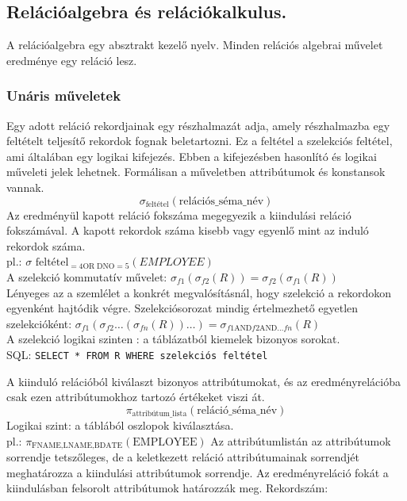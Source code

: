 \subsection{Relációalgebra és relációkalkulus. }
A relációalgebra egy absztrakt kezelő nyelv. Minden relációs algebrai művelet eredménye egy reláció lesz.

\subsubsection{Unáris műveletek}
\begin{description}[nosep]
	\item[Szelekció ($\sigma$)] Egy adott reláció rekordjainak egy részhalmazát adja, amely részhalmazba egy feltételt teljesítő rekordok fognak beletartozni. Ez a feltétel a szelekciós feltétel, ami általában egy logikai kifejezés. Ebben a kifejezésben hasonlító és logikai műveleti jelek lehetnek. Formálisan a műveletben attribútumok és konstansok vannak.\\
	$$\sigma_\text{feltétel}(\text{relációs\_séma\_név})$$
	Az eredményül kapott reláció fokszáma megegyezik a kiindulási reláció fokszámával. A kapott rekordok száma kisebb vagy egyenlő mint az induló rekordok száma.\\
	pl.: $\sigma\text{ feltétel}_{=4 \text{OR}\;\text{DNO}=5}(EMPLOYEE)$\\
	A szelekció kommutatív művelet: $\sigma_{f1}(\sigma_{f2}(R))=\sigma_{f2}(\sigma_{f1}(R))$\\
	Lényeges az a szemlélet a konkrét megvalósításnál, hogy szelekció a rekordokon egyenként hajtódik végre. Szelekciósorozat mindig értelmezhető egyetlen szelekcióként:
	$\sigma_{f1}(\sigma_{f2}\dots(\sigma_{fn}(R))\dots)=\sigma_{f1 \text{AND} f2 \text{AND} \dots fn}(R)$\\
	A szelekció logikai szinten : a táblázatból kiemelek bizonyos sorokat.\\
	SQL: \verb|SELECT * FROM R WHERE szelekciós feltétel|
	\item[Projekció ($\pi$)] A kiinduló relációból kiválaszt bizonyos attribútumokat, és az eredményrelációba csak ezen attribútumokhoz tartozó értékeket viszi át.
	$$\pi_\text{attribútum\_lista}(\text{reláció\_séma\_név})$$
	Logikai szint: a táblából oszlopok kiválasztása.\\
	pl.: $\pi_\text{FNAME,LNAME,BDATE}(\text{EMPLOYEE})$
	Az attribútumlistán az attribútumok sorrendje tetszőleges, de a keletkezett reláció attribútumainak sorrendjét meghatározza a kiindulási attribútumok sorrendje. Az eredményreláció fokát a kiindulásban felsorolt attribútumok határozzák meg. Rekordszám:\\

\end{description}
